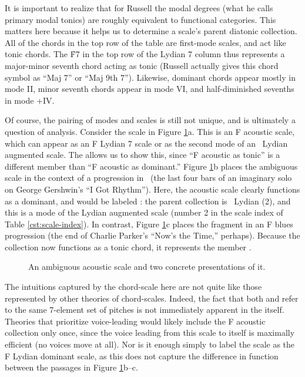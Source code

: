 It is important to realize that for Russell the modal degrees (what he calls
primary modal tonics) are roughly equivalent to functional categories. This
matters here because it helps us to determine a scale's parent
diatonic collection. All of the chords in the top row of the table are
first-mode scales, and act like tonic chords. The \h{F7} in the top row of the
Lydian \flat{}7 column thus represents a major-minor seventh chord acting as
tonic (Russell actually gives this chord symbol as ``Maj \flat{}7'' or ``Maj
9th \flat{}7''). Likewise, dominant chords appear mostly in mode II, minor
seventh chords appear in mode VI, and half-diminished sevenths in mode
+IV.

Of course, the pairing of modes and scales is still not unique, and is
ultimately a question of analysis. Consider the scale in Figure
\ref{cst:ambiguous-acoustic}a. This is an F acoustic scale, which can appear
as an F Lydian \flat{}7 scale or as the second mode of an \Eflat\ Lydian
augmented scale. The \gis allows us to show this, since ``F
acoustic as tonic'' is a different \gis member than ``F acoustic as
dominant.'' Figure \ref{cst:ambiguous-acoustic}b places the ambiguous scale in
the context of a \tfo progression in \Bflat\ (the last four bars of an
imaginary solo on George Gershwin's ``I Got Rhythm''). Here, the acoustic
scale clearly functions as a dominant, and would be labeled
: the parent collection is \Eflat\ Lydian
(2\flat), and this is a mode of the Lydian augmented scale (number 2 in the
scale index of Table \ref{cst:scale-index}). In contrast, Figure
\ref{cst:ambiguous-acoustic}c places the fragment in an F blues \tfo
progression (the end of Charlie Parker's ``Now's the Time,'' perhaps). Because
the collection now functions as a tonic chord, it represents the \gis member
.

\begin{figure}[tbp]
  \caption{An ambiguous acoustic scale and two concrete presentations of it.}
  \label{cst:ambiguous-acoustic}
\end{figure}

The intuitions captured by the chord-scale \gis here are not quite like those
represented by other theories of chord-scales. Indeed, the fact that both
 and  refer to
the same 7-element set of pitches is not immediately apparent in the \gis itself.
Theories that prioritize voice-leading would likely include the F acoustic
collection only once, since the voice leading from this scale to itself is
maximally efficient (no voices move at all). Nor is it enough simply to label
the scale as the F Lydian dominant scale, as this does not capture the
difference in function between the passages in Figure
\ref{cst:ambiguous-acoustic}b--c.

